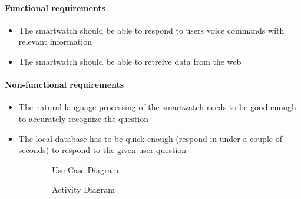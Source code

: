 \documentclass{article}
\begin{document}
		\paragraph{Functional requirements}
			\begin{itemize}
				\item The smartwatch should be able to respond to users voice commands with relevant information
				\item The smartwatch should be able to retreive data from the web
			\end{itemize}
			
			\paragraph{Non-functional requirements}
			\begin{itemize}
				\item The natural language processing of the smartwatch needs to be good enough to accurately recognize the question
				\item The local database has to be quick enough (respond in under a couple of seconds) to respond to the given user question
			\end{itemize}
		\clearpage
	
	
		\begin{figure}[htbp]
			\centering
			\begin{subfigure}{\textwidth}
				\centering
				
				\caption{Use Case Diagram}
			\end{subfigure}
			\begin{subfigure}{\textwidth}
			\end{subfigure}
		\end{figure}
		\clearpage
		
		\begin{figure}[htbp]
			\centering
			\begin{subfigure}{\textwidth}
				\centering
				
				\caption{Activity Diagram}
			\end{subfigure}
			\begin{subfigure}{\textwidth}
			\end{subfigure}
		\end{figure}
		\clearpage
		
\end{document}
